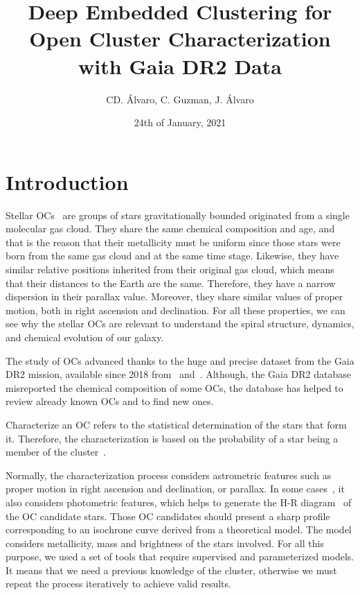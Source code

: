 \documentclass[11pt,a4paper,english,twocolumn]{article}
\title{Deep Embedded Clustering for Open Cluster Characterization with Gaia DR2 Data}
\author{CD. Álvaro, C. Guzman, J. Álvaro}
\date{24th of January, 2021}
\begin{document}
\twocolumn[
\begin{@twocolumnfalse}
\maketitle
\end{@twocolumnfalse}
]

\section{Introduction}

Stellar OCs~\cite{janes1982open} are groups of stars gravitationally bounded originated from a single molecular gas cloud. They share the same chemical composition and age, and that is the reason that their metallicity must be uniform since those stars were born from the same gas cloud and at the same time stage. Likewise, they have similar relative positions inherited from their original gas cloud, which means that their distances to the Earth are the same. Therefore, they have a narrow dispersion in their parallax value. Moreover, they share similar values of proper motion, both in right ascension and declination. For all these properties, we can see why the stellar OCs are relevant to understand the spiral structure, dynamics, and chemical evolution of our galaxy.

The study of OCs advanced thanks to the huge and precise dataset from the Gaia DR2 mission, available since 2018 from~\cite{collaboration2016description} and~\cite{gaia2018gaia}. Although, the Gaia DR2 database misreported the chemical composition of some OCs, the database has helped to review already known OCs and to find new ones.

Characterize an OC refers to the statistical determination of the stars that form it. Therefore, the characterization is based on the probability of a star being a member of the cluster~\cite{sampedro2016caracterizacion}.

Normally, the characterization process considers astrometric features such as proper motion in right ascension and declination, or parallax. In some cases~\cite{oliveira2013fitting}, it also considers photometric features, which helps to generate the H-R diagram~\cite{hypki2018gaia} of the OC candidate stars. Those OC candidates should present a sharp profile corresponding to an isochrone curve derived from a theoretical model. The model considers metallicity, mass and brightness of the stars involved. For all this purpose, we used a set of tools that require supervised and parameterized models. It means that we need a previous knowledge of the cluster, otherwise we must repeat the process iteratively to achieve valid results.
\end{document}
